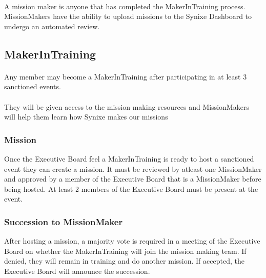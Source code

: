\documentclass[10pt,a4paper]{article}
\begin{document}
\paragraph{}
A mission maker is anyone that has completed the MakerInTraining process. MissionMakers have the ability to upload missions to the Synixe Dashboard to undergo an automated review.
\subsection{MakerInTraining}
\paragraph{}
Any member may become a MakerInTraining after participating in at least 3 sanctioned events.
\paragraph{}
They will be given access to the mission making resources and MissionMakers will help them learn how Synixe makes our missions
\subsubsection{Mission}
Once the Executive Board feel a MakerInTraining is ready to host a sanctioned event they can create a mission. It must be reviewed by atleast one MissionMaker and approved by a member of the Executive Board that is a MissionMaker before being hosted. At least 2 members of the Executive Board must be present at the event.
\subsubsection{Succession to MissionMaker}
After hosting a mission, a majority vote is required in a meeting of the Executive Board on whether the MakerInTraining will join the mission making team. If denied, they will remain in training and do another mission. If accepted, the Executive Board will announce the succession.
\end{document}
